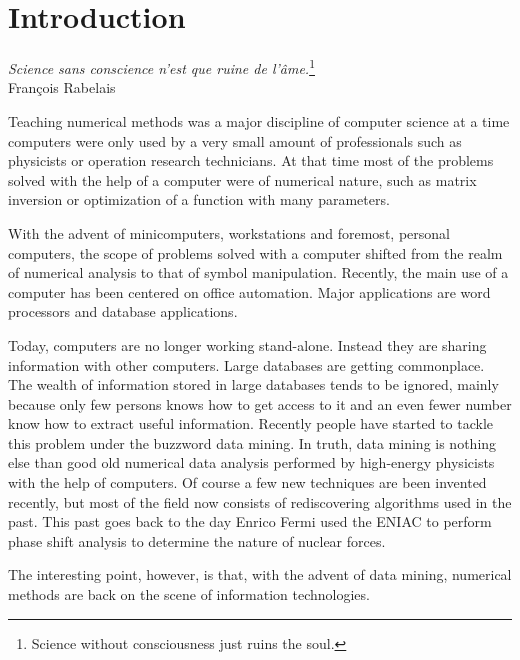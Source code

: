\documentclass[twoside]{book}
\begin{document}
\fi

\chapter{Introduction} \vspace{1 ex}
\label{ch:introduction}
\begin{flushright}
{\sl Science sans conscience n'est que ruine de
l'\^ame.}\footnote{Science without consciousness just ruins the
soul.}\\ Fran\c{c}ois Rabelais
\end{flushright}
\vspace{1 ex} Teaching numerical methods was a major discipline of
computer science at a time computers were only used by a very
small amount of professionals such as physicists or operation
research technicians. At that time most of the problems solved
with the help of a computer were of numerical nature, such as
matrix inversion or optimization of a function with many
parameters.
\par
With the advent of minicomputers, workstations and foremost,
personal computers, the scope of problems solved with a computer
shifted from the realm of numerical analysis to that of symbol
manipulation. Recently, the main use of a computer has been
centered on office automation. Major applications are word
processors and database applications.
\par
Today, computers are no longer working stand-alone. Instead they
are sharing information with other computers. Large databases are
getting commonplace. The wealth of information stored in large
databases tends to be ignored, mainly because only few persons
knows how to get access to it and an even fewer number know how to
extract useful information. Recently people have started to tackle
this problem under the buzzword data mining. In truth, data mining
is nothing else than good old numerical data analysis performed by
high-energy physicists with the help of computers. Of course a few
new techniques are been invented recently, but most of the field
now consists of rediscovering algorithms used in the past. This
past goes back to the day Enrico Fermi used the ENIAC to perform
phase shift analysis to determine the nature of nuclear forces.
\par
The interesting point, however, is that, with the advent of data
mining, numerical methods are back on the scene of information
technologies.
\end{document}
